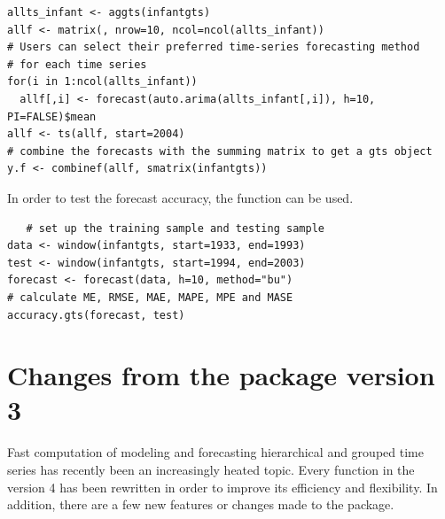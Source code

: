 \documentclass[nojss]{jss}
\begin{document}
\begin{Verbatim}
allts_infant <- aggts(infantgts)
allf <- matrix(, nrow=10, ncol=ncol(allts_infant))
# Users can select their preferred time-series forecasting method
# for each time series
for(i in 1:ncol(allts_infant))
  allf[,i] <- forecast(auto.arima(allts_infant[,i]), h=10, PI=FALSE)$mean
allf <- ts(allf, start=2004)
# combine the forecasts with the summing matrix to get a gts object
y.f <- combinef(allf, smatrix(infantgts))
\end{Verbatim}
In order to test the forecast accuracy, the  function can be used.
\begin{Verbatim}   # set up the training sample and testing sample
data <- window(infantgts, start=1933, end=1993)
test <- window(infantgts, start=1994, end=2003)
forecast <- forecast(data, h=10, method="bu")
# calculate ME, RMSE, MAE, MAPE, MPE and MASE
accuracy.gts(forecast, test)
\end{Verbatim}

\section*{Changes from the  package version 3}
Fast computation of modeling and forecasting hierarchical and grouped time series has recently been an increasingly heated topic. Every function in the  version 4 has been rewritten in order to improve its efficiency and flexibility. In addition, there are a few new features or changes made to the  package.
\end{document}
